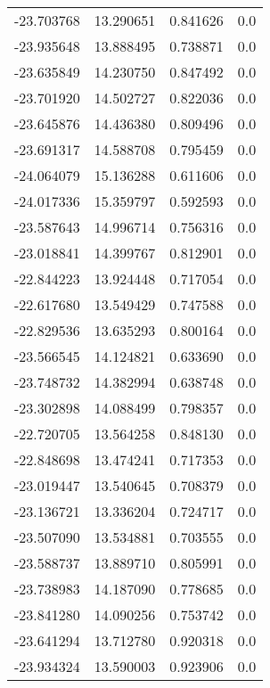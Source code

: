 \begin{tabular}{rrrr}
      -23.703768 &        13.290651 &    0.841626 &   0.0 \\
      -23.935648 &        13.888495 &    0.738871 &   0.0 \\
      -23.635849 &        14.230750 &    0.847492 &   0.0 \\
      -23.701920 &        14.502727 &    0.822036 &   0.0 \\
      -23.645876 &        14.436380 &    0.809496 &   0.0 \\
      -23.691317 &        14.588708 &    0.795459 &   0.0 \\
      -24.064079 &        15.136288 &    0.611606 &   0.0 \\
      -24.017336 &        15.359797 &    0.592593 &   0.0 \\
      -23.587643 &        14.996714 &    0.756316 &   0.0 \\
      -23.018841 &        14.399767 &    0.812901 &   0.0 \\
      -22.844223 &        13.924448 &    0.717054 &   0.0 \\
      -22.617680 &        13.549429 &    0.747588 &   0.0 \\
      -22.829536 &        13.635293 &    0.800164 &   0.0 \\
      -23.566545 &        14.124821 &    0.633690 &   0.0 \\
      -23.748732 &        14.382994 &    0.638748 &   0.0 \\
      -23.302898 &        14.088499 &    0.798357 &   0.0 \\
      -22.720705 &        13.564258 &    0.848130 &   0.0 \\
      -22.848698 &        13.474241 &    0.717353 &   0.0 \\
      -23.019447 &        13.540645 &    0.708379 &   0.0 \\
      -23.136721 &        13.336204 &    0.724717 &   0.0 \\
      -23.507090 &        13.534881 &    0.703555 &   0.0 \\
      -23.588737 &        13.889710 &    0.805991 &   0.0 \\
      -23.738983 &        14.187090 &    0.778685 &   0.0 \\
      -23.841280 &        14.090256 &    0.753742 &   0.0 \\
      -23.641294 &        13.712780 &    0.920318 &   0.0 \\
      -23.934324 &        13.590003 &    0.923906 &   0.0 \\

\end{tabular}
